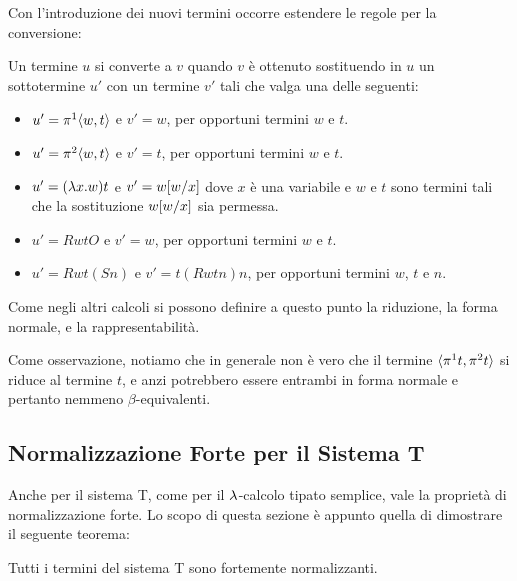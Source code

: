 \documentclass[]{marticle}
\begin{document}
Con l'introduzione dei nuovi termini occorre estendere le regole per la
conversione:
\begin{block}[Definizione]
    Un termine $u$ si converte a $v$ quando $v$ \`e ottenuto sostituendo in $u$
    un sottotermine $u'$ con un termine $v'$ tali che valga una delle seguenti:
    \begin{itemize}
        \item $u'=\pi^1\langle w,t \rangle$ e $v'=w$, per opportuni termini $w$ e $t$.
        \item $u'=\pi^2\langle w,t \rangle$ e $v'=t$, per opportuni termini $w$ e $t$.
        \item $u'= (\lambda x. w)t$ e $v' = w[w/x]$ dove $x$ \`e una variabile e
            $w$ e $t$ sono termini tali che la sostituzione $w[w/x]$ sia
            permessa.
        \item $u' = RwtO$ e $v'=w$, per opportuni termini $w$ e $t$.
        \item $u' = Rwt(Sn)$ e $v' = t(Rwtn)n$, per opportuni termini $w$, $t$ e
            $n$.
    \end{itemize}
\end{block}

Come negli altri calcoli si possono definire a questo punto la riduzione, la
forma normale, e la rappresentabilit\`a.

Come osservazione, notiamo che in generale non \`e vero che il termine
$\langle \pi^1t, \pi^2t \rangle$ si riduce al termine $t$, e anzi potrebbero essere
entrambi in forma normale e pertanto nemmeno $\beta$-equivalenti. 


\subsection{Normalizzazione Forte per il Sistema T}

Anche per il sistema T, come per il $\lambda$-calcolo tipato semplice, vale la
propriet\`a di normalizzazione forte. Lo scopo di questa sezione \`e appunto
quella di dimostrare il seguente teorema:
\begin{block}[Teorema]
    Tutti i termini del sistema T sono fortemente normalizzanti.
\end{block}
\end{document}
